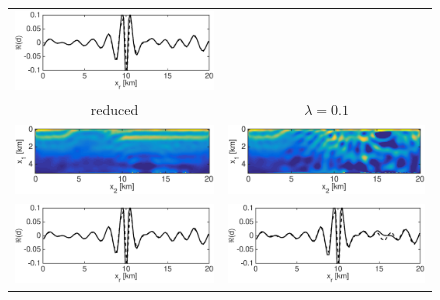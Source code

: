 \documentclass{iopart}
\begin{document}
\begin{figure}
\begin{tabular}{cc}
\includegraphics[scale=.3]{./figs/2D_overthrust2_m}\\
{\small reduced}&
{\small $\lambda=0.1$}\\
\includegraphics[scale=.3]{./figs/2D_overthrust2_i}&
\includegraphics[scale=.3]{./figs/2D_overthrust2_j}\\
\includegraphics[scale=.3]{./figs/2D_overthrust2_n}&
\includegraphics[scale=.3]{./figs/2D_overthrust2_o}\\

\end{tabular}
\end{figure}
\end{document}
